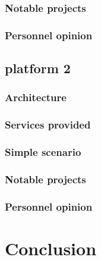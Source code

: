 \documentclass[a4paper,11pt]{report}
\begin{document}
  \subsubsection{Notable projects}
  
  \subsubsection{Personnel opinion}
  
  \subsection{platform 2} %
  
  \subsubsection{Architecture}
  
  \subsubsection{Services provided}
  
  \subsubsection{Simple scenario}
  
  \subsubsection{Notable projects}
  
  \subsubsection{Personnel opinion}
  
  
  
  
  \section{Conclusion}

  
%
%
\end{document}
